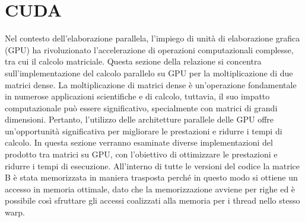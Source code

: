 \documentclass[conference]{IEEEtran}
\begin{document}
\section{CUDA}
Nel contesto dell'elaborazione parallela, l'impiego di unità di elaborazione grafica (GPU) ha rivoluzionato l'accelerazione di operazioni computazionali complesse, tra cui il calcolo matriciale. Questa sezione della relazione si concentra sull'implementazione del calcolo parallelo su GPU per la moltiplicazione di due matrici dense. La moltiplicazione di matrici dense è un'operazione fondamentale in numerose applicazioni scientifiche e di calcolo, tuttavia, il suo impatto computazionale può essere significativo, specialmente con matrici di grandi dimensioni. Pertanto, l'utilizzo delle architetture parallele delle GPU offre un'opportunità significativa per migliorare le prestazioni e ridurre i tempi di calcolo. In questa sezione verranno esaminate diverse implementazioni del prodotto tra matrici su GPU, con l'obiettivo di ottimizzare le prestazioni e ridurre i tempi di esecuzione. All'interno di tutte le versioni del codice la matrice B è stata memorizzata in maniera trasposta perché in questo modo si ottiene un accesso in memoria ottimale, dato che la memorizzazione avviene per righe ed è possibile così sfruttare gli accessi coalizzati alla memoria per i thread nello stesso warp.
\end{document}
